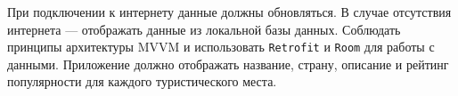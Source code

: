 При подключении к интернету данные должны обновляться.
В случае отсутствия интернета — отображать данные из локальной базы данных.
Соблюдать принципы архитектуры MVVM и использовать \texttt{Retrofit} и \texttt{Room} для работы с данными.
Приложение должно отображать название, страну, описание и рейтинг популярности для каждого туристического места.
